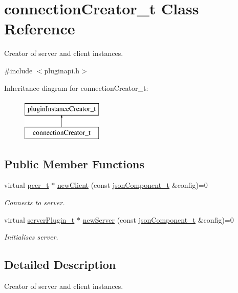 \hypertarget{classconnectionCreator__t}{\section{connection\-Creator\-\_\-t \-Class \-Reference}
\label{classconnectionCreator__t}
}


\-Creator of server and client instances.  




{\ttfamily \#include $<$pluginapi.\-h$>$}

\-Inheritance diagram for connection\-Creator\-\_\-t\-:\begin{figure}[H]
\begin{center}
\leavevmode
\includegraphics[height=2.000000cm]{classconnectionCreator__t}
\end{center}
\end{figure}
\subsection*{\-Public \-Member \-Functions}
\begin{DoxyCompactItemize}
\item 
virtual \hyperlink{classpeer__t}{peer\-\_\-t} $\ast$ \hyperlink{classconnectionCreator__t_a84e1e850dfcd0ef1867491ef94f8a132}{new\-Client} (const \hyperlink{classjsonComponent__t}{json\-Component\-\_\-t} \&config)=0
\begin{DoxyCompactList}\small\item\em \-Connects to server. \end{DoxyCompactList}\item 
virtual \hyperlink{classserverPlugin__t}{server\-Plugin\-\_\-t} $\ast$ \hyperlink{classconnectionCreator__t_a2a5eecbf71737cac119490f5b488ae6a}{new\-Server} (const \hyperlink{classjsonComponent__t}{json\-Component\-\_\-t} \&config)=0
\begin{DoxyCompactList}\small\item\em \-Initialises server. \end{DoxyCompactList}\end{DoxyCompactItemize}


\subsection{\-Detailed \-Description}
\-Creator of server and client instances. 

